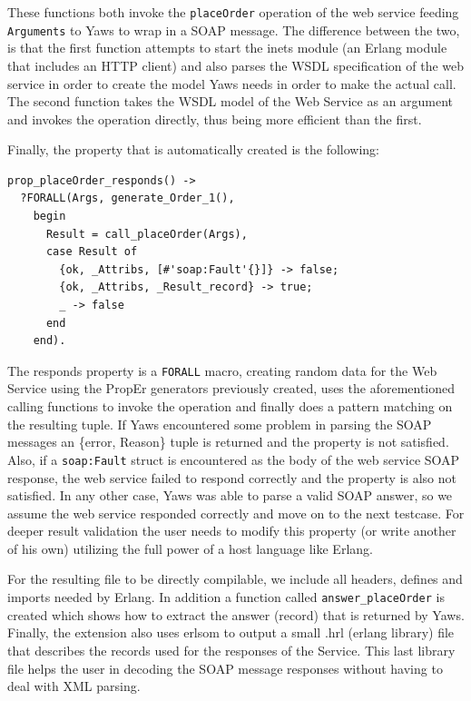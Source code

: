 \documentclass[submission,copyright,a4]{eptcs}
\begin{document}
These functions both invoke the \texttt{placeOrder} operation of the
web service feeding \texttt{Arguments} to Yaws to wrap in a SOAP
message. The difference between the two, is that the first function
attempts to start the inets module (an Erlang module that includes an
HTTP client) and also parses the WSDL specification of the web service
in order to create the model Yaws needs in order to make the actual
call. The second function takes the WSDL model of the Web Service as
an argument and invokes the operation directly, thus being more
efficient than the first.

Finally, the property that is automatically created is the following:

\begin{lstlisting}
prop_placeOrder_responds() ->
  ?FORALL(Args, generate_Order_1(),
    begin
      Result = call_placeOrder(Args),
      case Result of 
        {ok, _Attribs, [#'soap:Fault'{}]} -> false;
        {ok, _Attribs, _Result_record} -> true;
        _ -> false
      end
    end).
\end{lstlisting}

The responds property is a \texttt{FORALL} macro, creating random data for the Web Service using 
the PropEr generators previously created, uses the aforementioned calling functions to 
invoke the operation and finally does a pattern matching on the resulting tuple. If Yaws 
encountered some problem in parsing the SOAP messages an \{error, Reason\} tuple is returned
and the property is not satisfied. Also, if a \texttt{soap:Fault} struct is encountered as the 
body of the web service SOAP response, the web service failed to respond correctly and the 
property is also not satisfied. In any other case, Yaws was able to parse a valid SOAP answer, 
so we assume the web service responded correctly and move on to the next testcase. For deeper
result validation the user needs to modify this property (or write another of his own) utilizing
the full power of a host language like Erlang.

For the resulting file to be directly compilable, we include all headers, defines and imports 
needed by Erlang. In addition a function called \texttt{answer\_placeOrder} is created which 
shows how to extract the answer (record) that is returned by Yaws. Finally, the extension also 
uses erlsom to output a small .hrl (erlang library) file that describes the records used for the 
responses of the Service. This last library file helps the user in decoding the SOAP message 
responses without having to deal with XML parsing.
\end{document}
